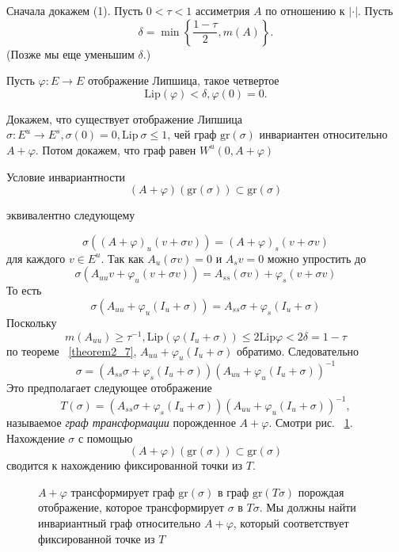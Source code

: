 \begin{demo}
Сначала докажем (1). Пусть $0 < \tau < 1$ ассиметрия $A$ по отношению к $|\cdot|$. Пусть 
$$
\delta = \min \left\{ \frac{1-\tau}{2}, m(A) \right\}.
$$
(Позже мы еще уменьшим $\delta$.)

Пусть $\varphi: E \rightarrow E$ отображение Липшица, такое четвертое
$$
\mathrm{Lip}(\varphi) < \delta, \varphi(0)=0.
$$

Докажем, что существует отображение Липшица $\sigma: E^u \rightarrow E^s, \sigma(0)=0, \mathrm{Lip} \ \sigma \leqslant 1$, чей граф $\mathrm{gr}(\sigma)$ инвариантен относительно $A+\varphi$. Потом докажем, что граф равен $W^u(0,A+ \varphi)$

Условие инвариантности 
$$
(A+\varphi)(\mathrm{gr}(\sigma)) \subset \mathrm{gr}(\sigma)
$$

эквивалентно следующему

$$
\sigma ((A+\varphi)_u(v+\sigma v)) = (A+\varphi)_s(v+\sigma v)
$$
для каждого $v \in E^u$. Так как $A_u(\sigma v)=0$ и $A_s v=0$ можно упростить до 
$$
\sigma (A_{uu}v+\varphi_u(v+\sigma v)) = A_{ss}(\sigma v)+\varphi_s(v + \sigma v)
$$
То есть 
$$
\sigma(A_{uu}+\varphi_u(I_u+\sigma)) = A_{ss}\sigma + \varphi_s(I_u+\sigma)
$$
Поскольку 
$$
m(A_{uu}) \geqslant \tau^{-1}, \mathrm{Lip}(\varphi(I_u+\sigma)) \leqslant 2 \mathrm{Lip} \varphi < 2\delta = 1-\tau
$$
по теореме ~\ref{theorem2_7}, $A_{uu}+\varphi_u(I_u + \sigma)$ обратимо. Следовательно
$$
\sigma = (A_{ss}\sigma+\varphi_s(I_u+\sigma))(A_{uu} + \varphi_u(I_u+\sigma))^{-1}
$$  
Это предполагает следующее отображение
$$
T(\sigma)=(A_{ss}\sigma + \varphi_s(I_u+\sigma))(A_{uu} + \varphi_u(I_u+\sigma))^{-1},
$$
называемое \textit{граф трансформации} порожденное $A+\varphi$. Смотри рис. ~\ref{picture2_10}. Нахождение $\sigma$ с помощью 
$$
(A+\varphi)(\mathrm{gr}(\sigma)) \subset \mathrm{gr}(\sigma)
$$
сводится к нахождению фиксированной точки из $T$.
\\
\begin{figure}[h]
\begin{center}
\begin{minipage}{.85\textwidth}
\begin{center}
\caption{$A + \varphi$ трансформирует граф $\mathrm{gr}(\sigma)$ в граф $\mathrm{gr}(T\sigma)$ порождая отображение, которое трансформирует $\sigma$ в $T\sigma$. Мы должны найти инвариантный граф относительно $A+\varphi$, который соответствует фиксированной точке из $T$ }
\label{picture2_10}
\end{center}
\end{minipage}
\end{center}
\end{figure}


\end{demo}
